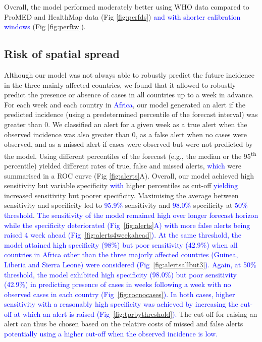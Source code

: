 \documentclass[9pt,twocolumn,twoside,lineno]{pnas-new}
\newcommand{\sangeeta}[1]{\textcolor{blue}{#1}}
\begin{document}
Overall, the model performed moderately better using WHO data compared
to ProMED and HealthMap data (Fig \ref{fig:perfds}) \sangeeta{and with shorter 
calibration windows} (Fig \ref{fig:perftw}).

\subsection*{Risk of spatial spread}
Although our model was not always able to robustly predict the future
incidence in the three mainly affected countries, we found that it
allowed to robustly predict the
presence or absence of cases in all countries up to a week in
advance. For each week and each country in \sangeeta{Africa}, our model
generated an alert if the predicted incidence (using a predetermined
percentile of the forecast interval) was greater than 0. We classified
an alert for a given week as a true
alert when the observed incidence was also greater than 0, as a false
alert when no cases were observed, and as a missed alert if cases were
observed but were not predicted by the model. Using different
percentiles of the forecast (e.g., the median or the
95\textsuperscript{th} percentile)
yielded different rates of true, false and missed alerts, \sangeeta{which} were
summarised in a ROC curve (Fig \ref{fig:alerts}A). Overall, our model 
achieved high sensitivity but variable specificity \sangeeta{with} higher
percentiles as cut-off \sangeeta{yielding} increased sensitivity but poorer
specificity. Maximising the average between
sensitivity and specificity led to \sangeeta{95.9\%} sensitivity and 
\sangeeta{98.0\%} specificity at \sangeeta{50\% threshold}. \sangeeta{The
sensitivity of the model remained high over longer forecast horizon 
while the specificity deteriorated (Fig~\ref{fig:alerts}A) with more false alerts being raised
4 week ahead (Fig~\ref{fig:alerts4weekahead}). At the same
threshold, the model attained high
specificity (98\%) but poor sensitivity (42.9\%)
when all countries in Africa other than
the three majorly affected countries (Guinea, Liberia and Sierra
Leone) were considered (Fig~\ref{fig:alertsallbut3}). 
Again, at 50\% threshold, the model exhibited 
high specificity (98.0\%) but poor sensitivity (42.9\%) in predicting 
presence of cases in weeks following a week with no observed cases in each
country (Fig~\ref{fig:rocnocases}). In both cases, higher sensitivity with a reasonably high
specificity was achieved by increasing the cut-off at which an alert
is raised (Fig~\ref{fig:tprbythreshold}).} The cut-off for raising an alert 
can thus be chosen based
on the relative costs of missed and false alerts \sangeeta{potentially
using a higher cut-off when the observed incidence is low.}
\end{document}
